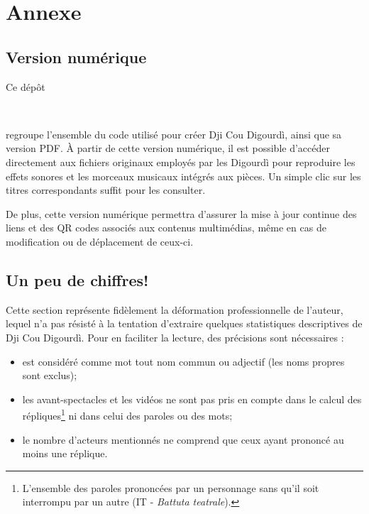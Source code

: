 \chapter*{Annexe}
\section*{Version numérique}\label{vers_num}
Ce dépôt
\begin{center}
\centering
\github\ \hspace*{0.5mm} \href{\detokenize{https://github.com/jbollon/Dji-cou-Digourdi}}{} \hspace*{0.5mm} \github\\
 \vspace*{2mm}
\end{center}
\noindent  regroupe l'ensemble du code utilisé pour créer Dji Cou Digourdì, ainsi que sa version PDF. À partir de cette version numérique, il est possible d'accéder directement aux fichiers originaux employés par les Digourdì pour reproduire les effets sonores et les morceaux musicaux intégrés aux pièces. Un simple clic sur les titres correspondants suffit pour les consulter.

De plus, cette version numérique permettra d’assurer la mise à jour continue des liens et des QR codes associés aux contenus multimédias, même en cas de modification ou de déplacement de ceux-ci.
\newpage
\section*{Un peu de chiffres!}
Cette section représente fidèlement la déformation professionnelle de l'auteur, lequel n'a pas résisté à la tentation d'extraire quel\-ques statistiques descriptives de Dji Cou Digourdì. Pour en faciliter la lecture, des précisions sont nécessaires :
\begin{itemize}
\item[•] est considéré comme mot tout nom commun ou adjectif (les noms propres sont exclus);
\item[•] les avant-spectacles et les vidéos ne sont pas pris en compte  dans le calcul des répliques\footnote{ L'ensemble des paroles prononcées par un personnage sans qu'il soit interrompu par un autre (IT - \textit{Battuta teatrale}).} ni dans celui des paroles ou des mots;
\item[•] le nombre d’acteurs mentionnés ne comprend que ceux ayant prononcé au moins une réplique.
\end{itemize}